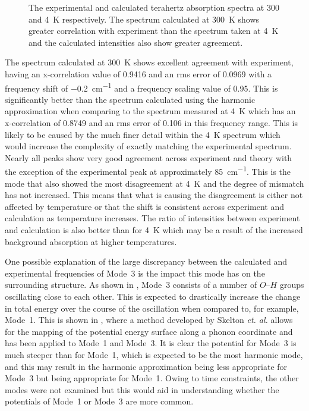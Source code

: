 \begin{figure}
\captionsetup{font = footnotesize, justification = centering}
\caption[The Calculated Terahertz Absorption Spectra at 300 and \SI{4}{K}]{The experimental and calculated terahertz absorption spectra at 300 and \SI{4}{K} respectively. The spectrum calculated at \SI{300}{K} shows greater correlation with experiment than the spectrum taken at \SI{4}{K} and the calculated intensities also show greater agreement.}
\label{Fig:RTvsEXP}
\end{figure}

The spectrum calculated at \SI{300}{K} shows excellent agreement with experiment, having an x-correlation value of 0.9416 and an \acrshort{rms} error of 0.0969 with a frequency shift of \SI{-0.2}{cm^{-1}} and a frequency scaling value of 0.95. This is significantly better than the spectrum calculated using the harmonic approximation when comparing to the spectrum measured at \SI{4}{K} which has an x\nobreakdash-correlation of 0.8749 and an \acrshort{rms} error of 0.106 in this frequency range. This is likely to be caused by the much finer detail within the \SI{4}{K} spectrum which would increase the complexity of exactly matching the experimental spectrum. Nearly all peaks show very good agreement across experiment and theory with the exception of the experimental peak at approximately \SI{85}{cm^{-1}}. This is the mode that also showed the most disagreement at \SI{4}{K} and the degree of mismatch has not increased. This means that what is causing the disagreement is either not affected by temperature or that the shift is consistent across experiment and calculation as temperature increases. The ratio of intensities between experiment and calculation is also better than for \SI{4}{K} which may be a result of the increased background absorption at higher temperatures.

One possible explanation of the large discrepancy between the calculated and experimental frequencies of Mode~3 is the impact this mode has on the surrounding structure. As shown in , Mode~3 consists of a number of \(O\)\nobreakdash--\(H\) groups oscillating close to each other. This is expected to drastically increase the change in total energy over the course of the oscillation when compared to, for example, Mode~1. This is shown in , where a method developed by Skelton \textit{et. al.} \cite{Skelton2016} allows for the mapping of the potential energy surface along a phonon coordinate and has been applied to Mode~1 and Mode~3. It is clear the potential for Mode~3 is much steeper than for Mode~1, which is expected to be the most harmonic mode, and this may result in the harmonic approximation being less appropriate for Mode~3 but being appropriate for Mode~1. Owing to time constraints, the other modes were not examined but this would aid in understanding whether the potentials of Mode~1 or Mode~3 are more common.

